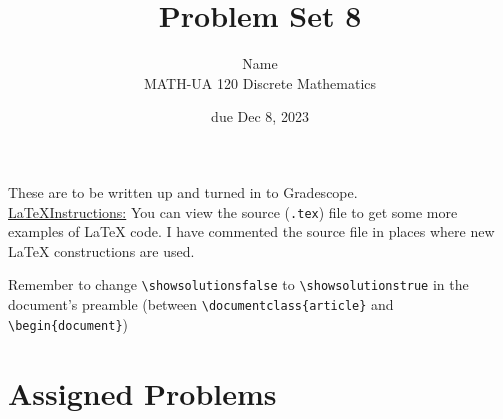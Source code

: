 \documentclass{article}
\title{Problem Set 8}
\author{%
    Name
\\  MATH-UA 120 Discrete Mathematics
}
\date{due Dec 8, 2023}
\newif\ifshowsolutions
\newcommand{\danger}{\marginpar[\hfill\dbend]{\dbend\hfill}}
\theoremstyle{definition}
\begin{document}
\maketitle



These are to be written up and turned in to Gradescope.\\



\ifshowsolutions
    \SetupExSheets{solution/print=true}
\else
    \danger
 \underline{ \LaTeX  Instructions:}  You can view the source (\texttt{.tex}) file to get some more examples of \LaTeX{} code.  I have commented the source file in places where new \LaTeX{} constructions are used.
  
  Remember to change \verb|\showsolutionsfalse| to \verb|\showsolutionstrue|
    in the document's preamble 
    (between \verb|\documentclass{article}| and \verb|\begin{document}|)
\fi

\section*{Assigned Problems}
\end{document}

